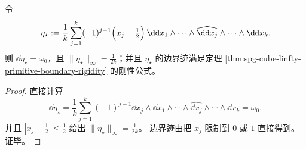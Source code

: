 \begin{corollary}[一个实现极小常数的显式原始]\label{cor:spg-cube-linfty-primitive-explicit-minimizer}
令
\[
\eta_\star
:=
\frac1k\sum_{j=1}^k(-1)^{j-1}\Bigl(x_j-\tfrac12\Bigr)\,
\dd x_1\wedge\cdots\wedge\widehat{\dd x_j}\wedge\cdots\wedge \dd x_k.
\]
则 \(\dd\eta_\star=\omega_0\)，且 \(\|\eta_\star\|_\infty=\frac{1}{2k}\)；并且 \(\eta_\star\) 的边界迹满足定理 \ref{thm:spg-cube-linfty-primitive-boundary-rigidity} 的刚性公式。
\end{corollary}
\begin{proof}
直接计算
\[
\dd\eta_\star
=\frac1k\sum_{j=1}^k(-1)^{j-1}\dd x_j\wedge
\dd x_1\wedge\cdots\wedge\widehat{\dd x_j}\wedge\cdots\wedge \dd x_k
=\omega_0.
\]
并且 \(|x_j-\tfrac12|\le\tfrac12\) 给出 \(\|\eta_\star\|_\infty=\frac{1}{2k}\)。
边界迹由把 \(x_j\) 限制到 \(0\) 或 \(1\) 直接得到。证毕。
\end{proof}
